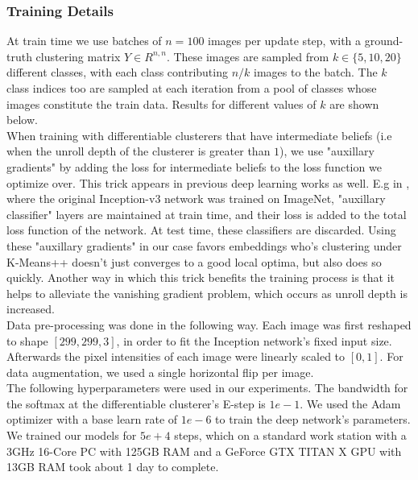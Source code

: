 \subsubsection{Training Details}
At train time we use batches of $n=100$ images per update step, with a ground-truth clustering matrix $Y\in R^{n,n}$. These images are sampled from $k\in{\{5,10,20\}}$ different classes, with each class contributing $n/k$ images to the batch. The $k$ class indices too are sampled at each iteration from a pool of classes whose images constitute the train data. Results for different values of $k$ are shown below.\\
When training with differentiable clusterers that have intermediate beliefs (i.e when the unroll depth of the clusterer is greater than $1$), we use "auxillary gradients" by adding the loss for intermediate beliefs to the loss function we optimize over. This trick appears in previous deep learning works as well. E.g in \cite{greenwade93}, where the original Inception-v3 network was trained on ImageNet, "auxillary classifier" layers are maintained at train time, and their loss is added to the total loss function of the network. At test time, these classifiers are discarded. Using these "auxillary gradients" in our case favors embeddings who's clustering under K-Means++ doesn't just converges to a good local optima, but also does so quickly. Another way in which this trick benefits the training process is that it helps to alleviate the vanishing gradient problem\cite{greenwade93}, which occurs as unroll depth is increased.\\ %
Data pre-processing was done in the following way. Each image was first reshaped to shape $[299,299,3]$, in order to fit the Inception network's fixed input size. Afterwards the pixel intensities of each image were linearly scaled to $[0,1]$. For data augmentation, we used a single horizontal flip per image.\\
The following hyperparameters were used in our experiments. The bandwidth for the softmax at the differentiable clusterer's E-step is $1e-1$. We used the Adam \cite{} optimizer with a base learn rate of $1e-6$ to train the deep network's parameters.
We trained our models for $5e+4$ steps, which on a standard work station with a 3GHz 16-Core PC with 125GB RAM and a GeForce GTX TITAN X GPU with 13GB RAM took about 1 day to complete. 
